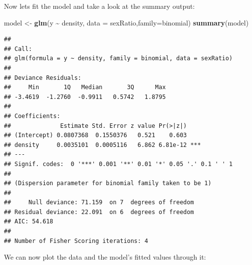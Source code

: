 \documentclass[
  a4paperpaper,
]{book}
\newenvironment{Shaded}{\begin{snugshade}}{\end{snugshade}}
\newcommand{\DataTypeTok}[1]{\textcolor[rgb]{0.13,0.29,0.53}{#1}}
\newcommand{\DecValTok}[1]{\textcolor[rgb]{0.00,0.00,0.81}{#1}}
\newcommand{\KeywordTok}[1]{\textcolor[rgb]{0.13,0.29,0.53}{\textbf{#1}}}
\newcommand{\NormalTok}[1]{#1}
\newcommand{\OperatorTok}[1]{\textcolor[rgb]{0.81,0.36,0.00}{\textbf{#1}}}
\newcommand{\StringTok}[1]{\textcolor[rgb]{0.31,0.60,0.02}{#1}}
\begin{document}
Now lets fit the model and take a look at the summary output:

\begin{Shaded}
\begin{Highlighting}[]
\NormalTok{model \textless{}{-}}\StringTok{ }\KeywordTok{glm}\NormalTok{(y }\OperatorTok{\textasciitilde{}}\StringTok{ }\NormalTok{density, }\DataTypeTok{data =}\NormalTok{ sexRatio,}\DataTypeTok{family=}\NormalTok{binomial)}
\KeywordTok{summary}\NormalTok{(model)  }
\end{Highlighting}
\end{Shaded}

\begin{verbatim}
## 
## Call:
## glm(formula = y ~ density, family = binomial, data = sexRatio)
## 
## Deviance Residuals: 
##     Min       1Q   Median       3Q      Max  
## -3.4619  -1.2760  -0.9911   0.5742   1.8795  
## 
## Coefficients:
##              Estimate Std. Error z value Pr(>|z|)    
## (Intercept) 0.0807368  0.1550376   0.521    0.603    
## density     0.0035101  0.0005116   6.862 6.81e-12 ***
## ---
## Signif. codes:  0 '***' 0.001 '**' 0.01 '*' 0.05 '.' 0.1 ' ' 1
## 
## (Dispersion parameter for binomial family taken to be 1)
## 
##     Null deviance: 71.159  on 7  degrees of freedom
## Residual deviance: 22.091  on 6  degrees of freedom
## AIC: 54.618
## 
## Number of Fisher Scoring iterations: 4
\end{verbatim}

We can now plot the data and the model's fitted values through it:

\begin{Shaded}
\end{Shaded}
\end{document}
